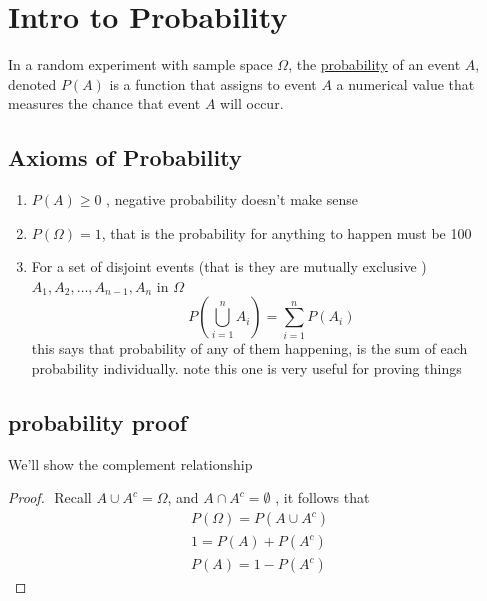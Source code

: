 \documentclass[11pt]{book}
\begin{document}

\section{Intro to Probability}%
\label{sec:intro_to_probability}

\begin{defn}[Probability]\label{defn:probability}
In a random experiment with sample space $\Omega $,  the \underline{probability} of an event $A$, denoted $P\left(A\right) $ is a function that assigns to event $A$ a numerical value that measures the chance that event $A$ will occur.      
\end{defn}

\subsection{Axioms of Probability}%
\label{sub:axioms_of_probability}

\begin{enumerate}
    \item $P\left(A\right) \ge 0$ , negative probability doesn't make sense
    \item $P\left(\Omega \right) = 1$,  that is the probability for anything to happen must be 100%
    \item For a set of disjoint events (that is they are mutually exclusive ) $A_{1} , A_{2} , \dotsc  , A_{n - 1} , A_{n} $ in $\Omega $ 
        \[
        P\left(\bigcup_{i=1}^{n} A_{i} \right) = \sum_{i=1}^{n} P\left(A_{i} \right)  
        \]
        this says that probability of any of them happening, is the sum of each probability individually. note this one is very useful for proving things
\end{enumerate}


\subsection{probability proof}%
\label{sub:probability_proof}

We'll show the complement relationship
\begin{proof}
    $ $\newline
    Recall $A\cup A^{c} = \Omega $, and $A\cap A^{c} = \emptyset $ , it follows that 
    \begin{gather*}
        P\left(\Omega \right) = P\left(A\cup A^{c} \right) \\
        1= P\left(A\right)  + P\left(A^{c} \right) \\
        P\left(A\right) = 1 - P\left(A^{c} \right) 
    \end{gather*}
\end{proof}
\end{document}
